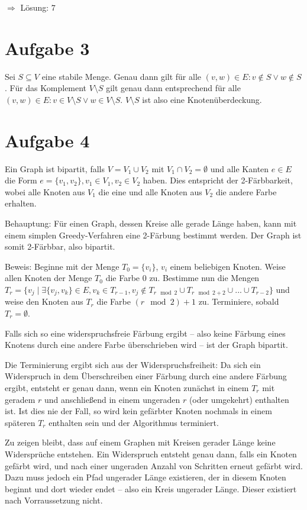 \documentclass[a4paper]{article}
\begin{document}
$\Rightarrow$ Lösung: $7$

\section{Aufgabe 3}

Sei $S \subseteq V$ eine stabile Menge.
Genau dann gilt für alle $(v, w) \in E: v \not\in S \vee w \not\in S$.
Für das Komplement $V \setminus S$ gilt genau dann entsprechend für alle $(v, w)
\in E: v \in V \setminus S \vee w \in V \setminus S$. $V \setminus S$ ist
also eine Knotenüberdeckung.

\section{Aufgabe 4}

Ein Graph ist bipartit, falls $V = V_1 \cup V_2$ mit $V_1 \cap V_2 = \emptyset$
und alle Kanten $e \in E$ die Form $e = \{v_1, v_2\}, v_1 \in V_1, v_2 \in
V_2$ haben. Dies entspricht der 2-Färbbarkeit, wobei alle Knoten aus $V_1$
die eine und alle Knoten aus $V_2$ die andere Farbe erhalten.

Behauptung: Für einen Graph, dessen Kreise alle gerade Länge haben, kann mit einem simplen
Greedy-Verfahren eine 2-Färbung bestimmt werden. Der Graph ist somit 2-Färbbar, also
bipartit.

Beweis:
Beginne mit der Menge $T_0 = \{v_i\}$, $v_i$ einem beliebigen Knoten.
Weise allen Knoten der Menge $T_0$ die Farbe $0$ zu.
Bestimme nun die Mengen $T_r = \{ v_j \mid \exists \{ v_j, v_k \} \in E, v_k
\in T_{r-1}, v_j \not\in T_{r \mod 2} \cup T_{r \mod 2 + 2} \cup ... \cup
T_{r-2} \}$ und weise den Knoten aus $T_r$ die Farbe $(r \mod 2) + 1$ zu.
Terminiere, sobald $T_r = \emptyset$.

Falls sich so eine widerspruchsfreie Färbung ergibt -- also keine Färbung
eines Knotens durch eine andere Farbe überschrieben wird -- ist der Graph
bipartit.

Die Terminierung ergibt sich aus der Widerspruchsfreiheit: Da sich ein
Widerspruch in dem Überschreiben einer Färbung durch eine andere Färbung
ergibt, entsteht er genau dann, wenn ein Knoten zunächst in einem $T_r$ mit
geradem $r$ und anschließend in einem ungeraden $r$ (oder umgekehrt)
enthalten ist. Ist dies nie der Fall, so wird kein gefärbter Knoten nochmals
in einem späteren $T_r$ enthalten sein und der Algorithmus terminiert.

Zu zeigen bleibt, dass auf einem Graphen mit Kreisen gerader Länge keine
Widersprüche entstehen. Ein Widerspruch entsteht genau dann, falls ein
Knoten gefärbt wird, und nach einer ungeraden Anzahl von Schritten erneut
gefärbt wird. Dazu muss jedoch ein Pfad ungerader Länge existieren, der in
diesem Knoten beginnt und dort wieder endet -- also ein Kreis ungerader
Länge. Dieser existiert nach Vorraussetzung nicht.
\end{document}

